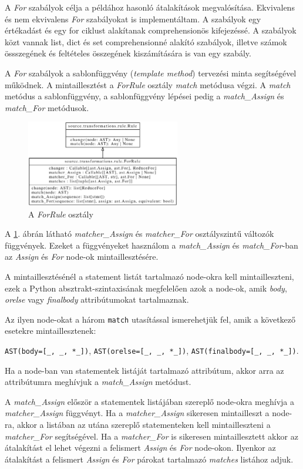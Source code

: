 A \emph{For} szabályok célja a példához hasonló átalakítások megvalósítása.
Ekvivalens és nem ekvivalens \emph{For} szabályokat is implementáltam.
A szabályok egy értékadást és egy for ciklust alakítanak comprehensionös kifejezéssé.
A szabályok közt vannak list, dict és set comprehensionné alakító szabályok,
illetve számok össszegének és feltételes összegének kiszámítására is van egy szabály.

A \emph{For} szabályok a sablonfüggvény (\emph{template method})
tervezési minta segítségével működnek.
A mintaillesztést a \emph{ForRule} osztály \emph{match} metódusa végzi.
A \emph{match} metódus a sablonfüggvény,
a sablonfüggvény lépései pedig
a \emph{match\_Assign} és \emph{match\_For} metódusok.

\begin{figure}[H]
	\centering
	\includegraphics[width=0.6\textwidth]{images/uml/ForRule.eps}
	\caption{\label{fig:ForRule}A \emph{ForRule} osztály}
\end{figure}

A \ref{fig:ForRule}. ábrán látható
\emph{matcher\_Assign} és \emph{matcher\_For} osztályszintű változók függvények.
Ezeket a függvényeket használom a
\emph{match\_Assign} és \emph{match\_For}-ban az \emph{Assign} és \emph{For}
node-ok mintaillesztésére.

A mintaillesztésénél a statement listát tartalmazó node-okra kell mintailleszteni,
ezek a Python absztrakt-szintaxisának megfelelően azok a node-ok,
amik \emph{body}, \emph{orelse} vagy \emph{finalbody} attribútumokat tartalmaznak.

Az ilyen node-okat a három \texttt{match} utasítással ismerehetjük fel,
amik a következő esetekre mintaillesztenek:

\lstinline{AST(body=[_, _, *_])},
\lstinline{AST(orelse=[_, _, *_])},
\lstinline{AST(finalbody=[_, _, *_])}.

Ha a node-ban van statementek listáját tartalmazó attribútum,
akkor arra az attribútumra meghívjuk a \emph{match\_Assign} metódust.

A \emph{match\_Assign} először a statementek listájában szereplő
node-okra meghívja a \emph{matcher\_Assign} függvényt.
Ha a \emph{matcher\_Assign} sikeresen mintailleszt a node-ra,
akkor a listában az utána szereplő
statementeken kell mintailleszteni a \emph{matcher\_For} segítségével.
Ha a \emph{matcher\_For} is sikeresen mintaillesztett akkor az átalakítást
el lehet végezni
a felismert \emph{Assign} és \emph{For} node-okon.
Ilyenkor az átalakítást a felismert \emph{Assign} és \emph{For} párokat tartalmazó
\emph{matches} listához adjuk.

